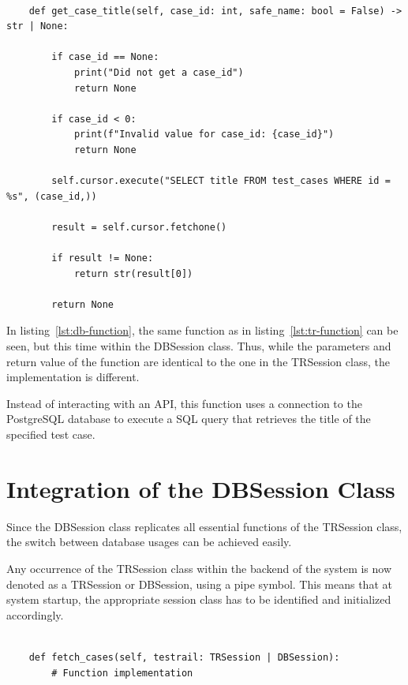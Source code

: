 \begin{lstlisting}[caption={Code snippet of the get\_case\_title function within the DBSession class.}, label={lst:db-function}]

    def get_case_title(self, case_id: int, safe_name: bool = False) -> str | None:

        if case_id == None:
            print("Did not get a case_id")
            return None
        
        if case_id < 0:
            print(f"Invalid value for case_id: {case_id}")
            return None
        
        self.cursor.execute("SELECT title FROM test_cases WHERE id = %s", (case_id,))

        result = self.cursor.fetchone()

        if result != None:
            return str(result[0])
        
        return None

\end{lstlisting}

In listing~\ref{lst:db-function}, the same function as in listing~\ref{lst:tr-function} can be seen, but this time within the DBSession class. Thus, while the parameters and return value of the function are identical to the one in the TRSession class, the implementation is different.

Instead of interacting with an API, this function uses a connection to the PostgreSQL database to execute a SQL query that retrieves the title of the specified test case. 

\section{Integration of the DBSession Class}

Since the DBSession class replicates all essential functions of the TRSession class, the switch between database usages can be achieved easily.

Any occurrence of the TRSession class within the backend of the system is now denoted as a TRSession or DBSession, using a pipe symbol. This means that at system startup, the appropriate session class has to be identified and initialized accordingly. 

\begin{lstlisting}[caption={Code snippet showcasing a function that takes a parameter that can be either a TRSession or a DBSession.}, label={lst:tr-or-db}]

    def fetch_cases(self, testrail: TRSession | DBSession):
        # Function implementation

\end{lstlisting}

